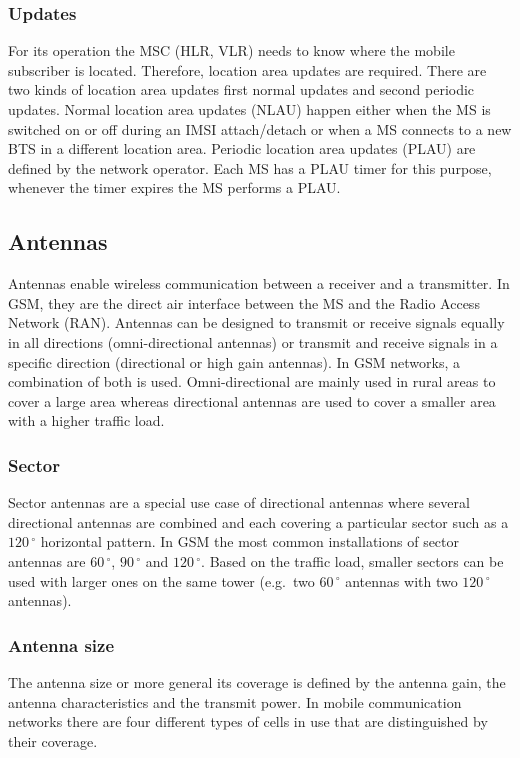 \documentclass[master,english]{hgbthesis}
\begin{document}
\subsubsection{Updates}
For its operation the MSC (HLR, VLR) needs to know where the mobile subscriber is located. Therefore, location area updates are required. There are two kinds of location area updates first normal updates and second periodic updates. Normal location area updates (NLAU) happen either when the MS is switched on or off during an IMSI attach/detach or when a MS connects to a new BTS in a different location area. Periodic location area updates (PLAU) are defined by the network operator. Each MS has a PLAU timer for this purpose, whenever the timer expires the MS performs a PLAU.
\subsection{Antennas}
Antennas enable wireless communication between a receiver and a transmitter. In GSM, they are the direct air interface between the MS and the Radio Access Network (RAN). Antennas can be designed to transmit or receive signals equally in all directions (omni-directional antennas) or transmit and receive signals in a specific direction (directional or high gain antennas). In GSM networks, a combination of both is used. Omni-directional are mainly used in rural areas to cover a large area whereas directional antennas are used to cover a smaller area with a higher traffic load.
\subsubsection{Sector}
Sector antennas are a special use case of directional antennas where several directional antennas are combined and each covering a particular sector such as a $120\,^{\circ}$ horizontal pattern. In GSM the most common installations of sector antennas are $60\,^{\circ}$, $90\,^{\circ}$ and $120\,^{\circ}$. Based on the traffic load, smaller sectors can be used with larger ones on the same tower (e.g.\ two $60\,^{\circ}$ antennas with two $120\,^{\circ}$ antennas).
\subsubsection{Antenna size}
The antenna size or more general its coverage is defined by the antenna gain, the antenna characteristics and the transmit power. In mobile communication networks there are four different types of cells in use that are distinguished by their coverage.
\end{document}
